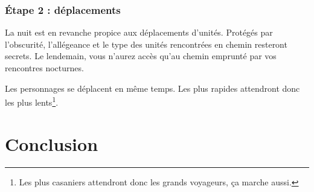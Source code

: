 \subsubsection{Étape 2 : déplacements}

La nuit est en revanche propice aux déplacements d'unités. Protégés par
l'obscurité, l'allégeance et le type des unités rencontrées en chemin
resteront secrets. Le lendemain, vous n'aurez accès qu'au chemin
emprunté par vos rencontres nocturnes.

Les personnages se déplacent en même temps. Les plus rapides
attendront donc les plus lents\footnote{Les plus casaniers attendront
  donc les grands voyageurs, ça marche aussi.}.


\newpage
\section{Conclusion}

